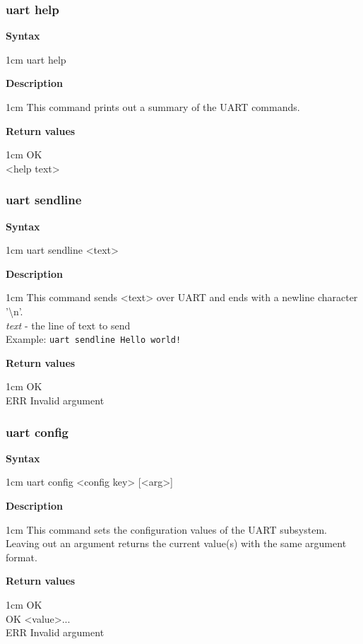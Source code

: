 \documentclass{article}[a4paper]
\begin{document}
\subsubsection{uart help}
\begin{tcolorbox}
	{\bf Syntax}

	 1cm \dimexpr\linewidth-2cm\relax
	uart help

	\medskip
	{\bf Description}

	 1cm \dimexpr\linewidth-2cm\relax
	This command prints out a summary of the UART commands.

	\medskip
	{\bf Return values}

	 1cm \dimexpr\linewidth-2cm\relax
	OK \\
	<help text>
\end{tcolorbox}

\subsubsection{uart sendline}
\begin{tcolorbox}
	{\bf Syntax}

	 1cm \dimexpr\linewidth-2cm\relax
	uart sendline <text>

	\medskip
	{\bf Description}

	 1cm \dimexpr\linewidth-2cm\relax
	This command sends <text> over UART and ends with a newline character '\textbackslash n'.
	\medskip \\
	{\it text} - the line of text to send \\

	\medskip
	Example: \texttt{uart sendline Hello world!}

	\medskip
	{\bf Return values}

	 1cm \dimexpr\linewidth-2cm\relax
	OK \\
	ERR Invalid argument
\end{tcolorbox}

\subsubsection{uart config}
\begin{tcolorbox}
	{\bf Syntax}

	 1cm \dimexpr\linewidth-2cm\relax
	uart config <config key> [<arg>]

	\medskip
	{\bf Description}

	 1cm \dimexpr\linewidth-2cm\relax
	This command sets the configuration values of the UART subsystem.
	Leaving out an argument returns the current value(s) with the same argument
	format.

	\medskip
	{\bf Return values}

	 1cm \dimexpr\linewidth-2cm\relax
	OK \\
	OK <value>... \\
	ERR Invalid argument
\end{tcolorbox}
\end{document}
